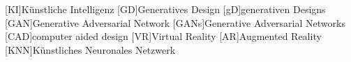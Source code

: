 \begin{acronym}
  [KI]{Künstliche Intelligenz}
  [GD]{Generatives Design}
  [gD]{generativen Designs}
  [GAN]{Generative Adversarial Network}
  [GANs]{Generative Adversarial Networks}
  [CAD]{computer aided design}
  [VR]{Virtual Reality}
  [AR]{Augmented Reality}
  [KNN]{Künstliches Neuronales Netzwerk}
\end{acronym}